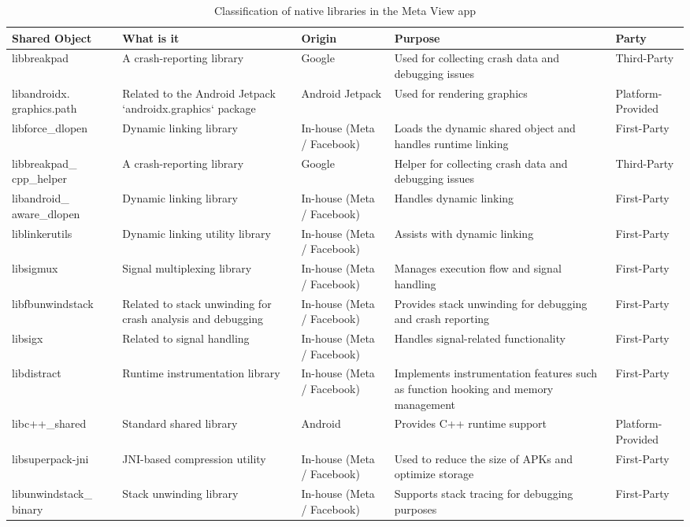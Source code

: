 \begin{table}[H]
  \centering
  \begin{tabular}{|L{0.18\textwidth}|L{0.21\textwidth}|L{0.12\textwidth}|L{0.25\textwidth}|L{0.09\textwidth}|}
    \hline
       \textbf{Shared Object} & \textbf{What is it} & \textbf{Origin} & \textbf{Purpose} & \textbf{Party} \\ \hline
       libbreakpad & A crash-reporting library & Google & Used for collecting crash data and debugging issues & Third-Party \\ \hline
       libandroidx. graphics.path & Related to the Android Jetpack `androidx.graphics` package & Android Jetpack & Used for rendering graphics & Platform-Provided \\ \hline
       libforce\_dlopen & Dynamic linking library & In-house (Meta / Facebook) & Loads the dynamic shared object and handles runtime linking & First-Party \\ \hline
       libbreakpad\_ cpp\_helper & A crash-reporting library & Google & Helper for collecting crash data and debugging issues & Third-Party \\ \hline
       libandroid\_ aware\_dlopen & Dynamic linking library & In-house (Meta / Facebook) & Handles dynamic linking & First-Party \\ \hline
       liblinkerutils & Dynamic linking utility library & In-house (Meta / Facebook) & Assists with dynamic linking & First-Party \\ \hline
       libsigmux & Signal multiplexing library & In-house (Meta / Facebook) & Manages execution flow and signal handling & First-Party \\ \hline
       libfbunwindstack & Related to stack unwinding for crash analysis and debugging & In-house (Meta / Facebook) & Provides stack unwinding for debugging and crash reporting & First-Party \\ \hline
       libsigx & Related to signal handling & In-house (Meta / Facebook) & Handles signal-related functionality & First-Party \\ \hline
       libdistract & Runtime instrumentation library & In-house (Meta / Facebook) & Implements instrumentation features such as function hooking and memory management & First-Party \\ \hline
       libc++\_shared & Standard shared library & Android & Provides C++ runtime support & Platform-Provided \\ \hline
       libsuperpack-jni & JNI-based compression utility & In-house (Meta / Facebook) & Used to reduce the size of APKs and optimize storage & First-Party \\ \hline
       libunwindstack\_ binary & Stack unwinding library & In-house (Meta / Facebook) & Supports stack tracing for debugging purposes & First-Party \\ \hline
  \end{tabular}
  \caption{Classification of native libraries in the Meta View app}
  \label{tab:sharedObjectsNativeLibraries}
\end{table}

